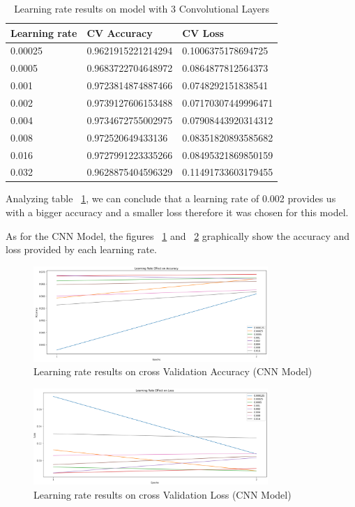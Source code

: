 \documentclass[conference]{IEEEtran}
\begin{document}
\begin{table}[H]
\centering
\caption{Learning rate results on model with 3 Convolutional Layers}
\label{table:model1_learning_rate}
\begin{tabular}{ | m{3.5em} | m{3.2cm}| m{3.2cm} | }
\hline
Learning rate & CV Accuracy & CV Loss \\ 
\hline
0.00025 & 0.9621915221214294 & 0.1006375178694725 \\
\hline
0.0005 & 0.9683722704648972 & 0.0864877812564373 \\
\hline
0.001 & 0.9723814874887466 & 0.0748292151838541 \\
\hline
0.002 & 0.9739127606153488 & 0.07170307449996471 \\
\hline
0.004 & 0.9734672755002975 & 0.07908443920314312 \\
\hline
0.008 & 0.972520649433136 & 0.08351820893585682 \\
\hline
0.016 & 0.9727991223335266 & 0.08495321869850159 \\
\hline
0.032 & 0.9628875404596329 & 0.11491733603179455 \\
\hline
\end{tabular}
\end{table}

Analyzing table ~\ref{table:model1_learning_rate}, we can conclude that a learning rate of 0.002 provides us with a bigger accuracy and a smaller loss therefore it was chosen for this model.


As for the CNN Model, the figures ~\ref{fig:model2_learning_rate_acc} and ~\ref{fig:model2_learning_rate_loss} graphically show the accuracy and loss provided by each learning rate.

\begin{figure}[H]
    \centering
    \includegraphics[width=3.5in]{pictures/model2_learning_rate_accuracy.png}
    \caption{Learning rate results on cross Validation Accuracy (CNN Model)}\label{fig:model2_learning_rate_acc}
\end{figure}

\begin{figure}[H]
    \centering
    \includegraphics[width=3.5in]{pictures/model2_learning_rate_loss.png}
    \caption{Learning rate results on cross Validation Loss (CNN Model)}\label{fig:model2_learning_rate_loss}
\end{figure}
\end{document}
